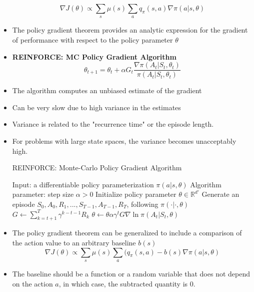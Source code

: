 \documentclass[a4paper]{article}
\begin{document}
\begin{itemize}
    \begin{equation*}
        \nabla J(\theta)\propto \sum_s\mu(s)\sum_aq_\pi(s,a)\nabla \pi(a|s,\theta)
    \end{equation*}
    \item The policy gradient theorem provides an analytic expression for the gradient of performance with respect to the policy parameter $\theta$
    \item \textbf{REINFORCE: MC Policy Gradient Algorithm}
    \begin{equation*}
        \theta_{t+1}=\theta_t+\alpha G_t\frac{\nabla \pi(A_t|S_t,\theta_t)}{\pi(A_t|S_t,\theta_t)}
    \end{equation*}
    \item The algorithm computes an unbiased estimate of the gradient
    \item Can be very slow due to high variance in the estimates
    \item Variance is related to the "recurrence time" or the episode length.
    \item For problems with large state spaces, the variance becomes unacceptably high.
    \begin{algorithm}[H]
        \caption{REINFORCE: Monte-Carlo Policy Gradient Algorithm}
        \begin{algorithmic}[1]
            \State Input: a differentiable policy parameterization $\pi(a|s,\theta)$
            \State Algorithm parameter: step size $\alpha>0$
            \State Initialize policy parameter $\theta \in \mathbb{R}^{d'}$
            \Statex
                \State Generate an episode $S_0,A_0,R_1,...,S_{T-1},A_{T-1},R_T$, following $\pi(\cdot|\cdot,\theta)$
                    \State $G\gets \sum_{k=t+1}^T\gamma^{k-t-1}R_k$
                    \State $\theta \gets \theta \alpha \gamma^tG\nabla \ln{\pi(A_t|S_t,\theta)}$
                \EndFor
            \EndFor
        \end{algorithmic}
    \end{algorithm}
    \item The policy gradient theorem can be generalized to include a comparison of the action value to an arbitrary baseline $b(s)$
    \begin{equation*}
        \nabla J(\theta)\propto \sum_s\mu(s)\sum_a(q_\pi(s,a)-b(s)\nabla \pi(a|s,\theta)
    \end{equation*}
    \item The baseline should be a function or a random variable that does not depend on the action $a$, in which case, the subtracted quantity is $0$.

\end{itemize}
\end{document}
